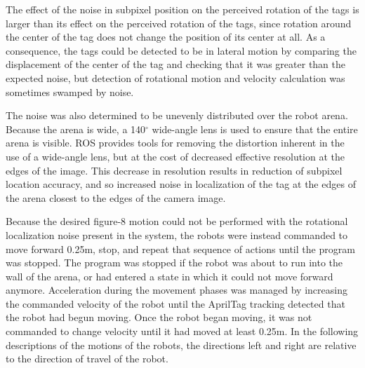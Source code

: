 The effect of the noise in subpixel position on the perceived rotation of the tags is larger than its effect on the perceived rotation of the tags, since rotation around the center of the tag does not change the position of its center at all. 
As a consequence, the tags could be detected to be in lateral motion by comparing the displacement of the center of the tag and checking that it was greater than the expected noise, but detection of rotational motion and velocity calculation was sometimes swamped by noise. 

The noise was also determined to be unevenly distributed over the robot arena. Because the arena is wide, a 140$^{\circ}$ wide-angle lens is used to ensure that the entire arena is visible. 
ROS provides tools for removing the distortion inherent in the use of a wide-angle lens, but at the cost of decreased effective resolution at the edges of the image. 
This decrease in resolution results in reduction of subpixel location accuracy, and so increased noise in localization of the tag at the edges of the arena closest to the edges of the camera image. 
%

Because the desired figure-8 motion could not be performed with the rotational localization noise present in the system, the robots were instead commanded to move forward 0.25m, stop, and repeat that sequence of actions until the program was stopped. 
The program was stopped if the robot was about to run into the wall of the arena, or had entered a state in which it could not move forward anymore. 
Acceleration during the movement phases was managed by increasing the commanded velocity of the robot until the AprilTag tracking detected that the robot had begun moving. 
Once the robot began moving, it was not commanded to change velocity until it had moved at least 0.25m.
In the following descriptions of the motions of the robots, the directions left and right are relative to the direction of travel of the robot. 

